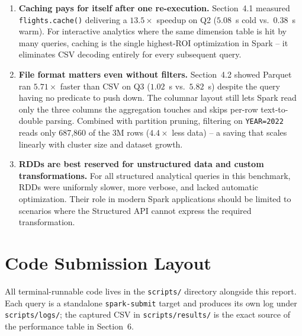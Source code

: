 \documentclass{article}
\begin{document}
\begin{enumerate}
    \item \textbf{Caching pays for itself after one re-execution.} Section~4.1 measured \texttt{flights.cache()} delivering a $13.5\times$ speedup on Q2 ($5.08$~s cold vs.\ $0.38$~s warm). For interactive analytics where the same dimension table is hit by many queries, caching is the single highest-ROI optimization in Spark -- it eliminates CSV decoding entirely for every subsequent query.

    \item \textbf{File format matters even without filters.} Section~4.2 showed Parquet ran $5.71\times$ faster than CSV on Q3 ($1.02$~s vs.\ $5.82$~s) despite the query having no predicate to push down. The columnar layout still lets Spark read only the three columns the aggregation touches and skips per-row text-to-double parsing. Combined with partition pruning, filtering on \texttt{YEAR=2022} reads only 687{,}860 of the 3M rows ($4.4\times$ less data) -- a saving that scales linearly with cluster size and dataset growth.

    \item \textbf{RDDs are best reserved for unstructured data and custom transformations.} For all structured analytical queries in this benchmark, RDDs were uniformly slower, more verbose, and lacked automatic optimization. Their role in modern Spark applications should be limited to scenarios where the Structured API cannot express the required transformation.
\end{enumerate}

\section{Code Submission Layout}

All terminal-runnable code lives in the \texttt{scripts/} directory alongside this report. Each query is a standalone \texttt{spark-submit} target and produces its own log under \texttt{scripts/logs/}; the captured CSV in \texttt{scripts/results/} is the exact source of the performance table in Section~6.
\end{document}
